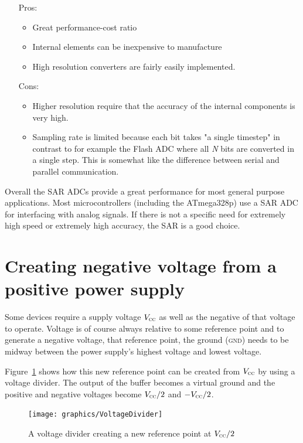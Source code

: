 \documentclass[11pt,a4paper,titlepage]{article}
\begin{document}
	\begin{itemize}
		\item[Pros:]
		\begin{itemize}
			\item Great performance-cost ratio
			\item Internal elements can be inexpensive to manufacture
			\item High resolution converters are fairly easily implemented.
		\end{itemize}
		\item[Cons:]
		\begin{itemize}
			\item Higher resolution require that the accuracy of the internal components is very high.
			\item Sampling rate is limited because each bit takes "a single timestep" in contrast to for example the Flash ADC where all \textit{N} bits are converted in a single step. This is somewhat like the difference between serial and parallel communication.
		\end{itemize}
	\end{itemize}
	
	
	\noindent Overall the SAR ADCs provide a great performance for most general purpose applications. Most microcontrollers (including the ATmega328p) use a SAR ADC for interfacing with analog signals. If there is not a specific need for extremely high speed or extremely high accuracy, the SAR is a good choice.
	
	
	\section{Creating negative voltage from a positive power supply}
	
	Some devices require a supply voltage $V_{\textsc{cc}}$ as well as the negative of that voltage to operate. Voltage is of course always relative to some reference point and to generate a negative voltage, that reference point, the ground (\textsc{gnd}) needs to be midway between the power supply's highest voltage and lowest voltage.
	
	Figure~\ref{fig:negvolt} shows how this new reference point can be created from $V_{\textsc{cc}}$ by using a voltage divider. The output of the buffer becomes a virtual ground and the positive and negative voltages become $V_{\textsc{cc}}/2$ and $-V_{\textsc{cc}}/2$.
	
	\begin{figure}[H]
		\centering
		\texttt{[image: graphics/VoltageDivider]}
		\caption{A voltage divider creating a new reference point at $V_{\textsc{cc}}/2$}
		\label{fig:negvolt}
	\end{figure}
	
\end{document}
